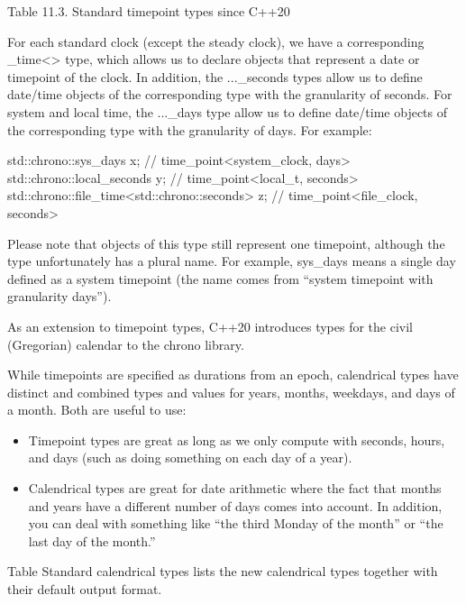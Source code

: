 \begin{center}
Table 11.3. Standard timepoint types since C++20
\end{center}

For each standard clock (except the steady clock), we have a corresponding \_time<> type, which allows us to declare objects that represent a date or timepoint of the clock. In addition, the ...\_seconds types allow us to define date/time objects of the corresponding type with the granularity of seconds. For system and local time, the ...\_days type allow us to define date/time objects of the corresponding type with the granularity of days. For example:

\begin{cpp}
std::chrono::sys_days x; // time_point<system_clock, days>
std::chrono::local_seconds y; // time_point<local_t, seconds>
std::chrono::file_time<std::chrono::seconds> z; // time_point<file_clock, seconds>
\end{cpp}

Please note that objects of this type still represent one timepoint, although the type unfortunately has a plural name. For example, sys\_days means a single day defined as a system timepoint (the name comes from “system timepoint with granularity days”).


As an extension to timepoint types, C++20 introduces types for the civil (Gregorian) calendar to the chrono library.

While timepoints are specified as durations from an epoch, calendrical types have distinct and combined types and values for years, months, weekdays, and days of a month. Both are useful to use:

\begin{itemize}
\item 
Timepoint types are great as long as we only compute with seconds, hours, and days (such as doing something on each day of a year).

\item 
Calendrical types are great for date arithmetic where the fact that months and years have a different number of days comes into account. In addition, you can deal with something like “the third Monday of the month” or “the last day of the month.”
\end{itemize}

Table Standard calendrical types lists the new calendrical types together with their default output format.

